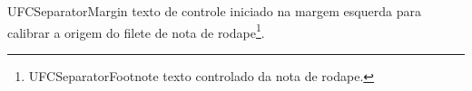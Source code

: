 \documentclass{abntexto-ufc}
\begin{document}
\textual

\noindent
UFCSeparatorMargin texto de controle iniciado na margem esquerda para calibrar a origem do filete de nota de rodape\footnote{UFCSeparatorFootnote texto controlado da nota de rodape.}.
\end{document}
